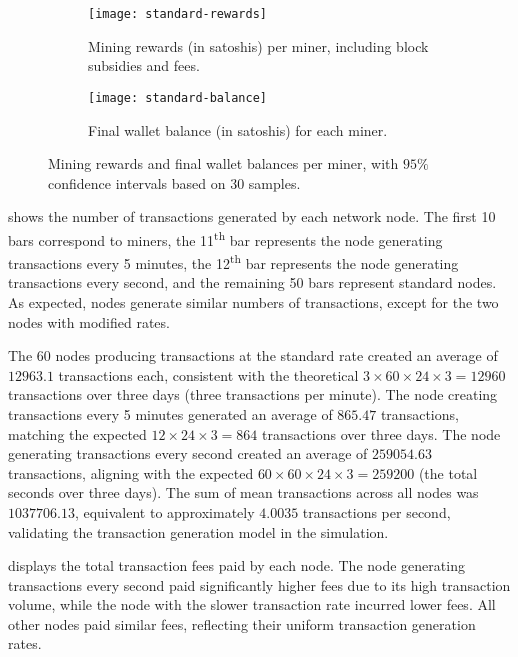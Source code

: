 \begin{figure}[tbhp]
	\centering
	\begin{subfigure}[b]{0.49\textwidth}
		\centering
		\texttt{[image: standard-rewards]}
		\caption{Mining rewards (in satoshis) per miner, including
		block subsidies and fees.}\label{subfig:general-rewards}
	\end{subfigure}
	\begin{subfigure}[b]{0.49\textwidth}
		\centering
		\texttt{[image: standard-balance]}
		\caption{Final wallet balance (in satoshis) for each
		miner.}\label{subfig:general-balance}
	\end{subfigure}
	\caption{Mining rewards and final wallet balances per miner, with
	\(95\%\) confidence intervals based on 30
	samples.}\label{fig:general-rewards-balance}
\end{figure}

 shows the number of transactions generated
by each network node. The first 10 bars correspond to miners, the
11\textsuperscript{th} bar represents the node generating transactions every 5
minutes, the 12\textsuperscript{th} bar represents the node generating
transactions every second, and the remaining 50 bars represent standard nodes.
As expected, nodes generate similar numbers of transactions, except for the two
nodes with modified rates.

The 60 nodes producing transactions at the standard rate created an average of
\(12963.1\) transactions each, consistent with the theoretical \(3 \times 60
\times 24 \times 3 = 12960\) transactions over three days (three transactions
per minute). The node creating transactions every 5 minutes generated an
average of \(865.47\) transactions, matching the expected \(12 \times 24 \times
3 = 864\) transactions over three days. The node generating transactions every
second created an average of \(259054.63\) transactions, aligning with the
expected \(60 \times 60 \times 24 \times 3 = 259200\) (the total seconds over
three days). The sum of mean transactions across all nodes was \(1037706.13\),
equivalent to approximately \(4.0035\) transactions per second, validating the
transaction generation model in the simulation.


 displays the total transaction fees paid by
each node. The node generating transactions every second paid significantly
higher fees due to its high transaction volume, while the node with the slower
transaction rate incurred lower fees. All other nodes paid similar fees,
reflecting their uniform transaction generation rates.

